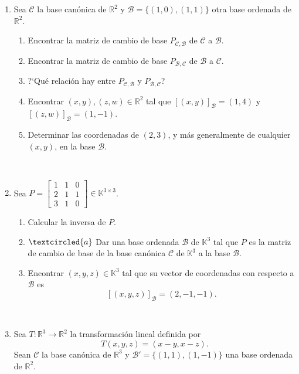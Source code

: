 \documentclass[12pt]{amsart}
\begin{document}
\begin{enumerate}
\item\label{otras bases} Sea $\mathcal{C}$ la base can\'onica de $\mathbb{R}^2$ y
	$\mathcal{B}=\{(1,0),(1,1)\}$ otra base ordenada de $\mathbb{R}^2$.
	\begin{enumerate}
		\item Encontrar la matriz de cambio de base $P_{\mathcal{C},\mathcal{B}}$ de $\mathcal{C}$ a $\mathcal{B}$.
		\item Encontrar la matriz de cambio de base $P_{\mathcal{B},\mathcal{C}}$ de $\mathcal{B}$ a $\mathcal{C}$.
		\item ?`Qu\'e relaci\'on hay entre $P_{\mathcal{C},\mathcal{B}}$ y $P_{\mathcal{B},\mathcal{C}}$?
		\item Encontrar $(x,y),(z,w)\in\mathbb{R}^2$ tal que $[(x,y)]_{\mathcal{B}}=(1,4)$ y $[(z,w)]_{\mathcal{B}}=(1,-1)$.
		\item Determinar las coordenadas de $(2,3)$, y m\'{a}s generalmente de cualquier $(x,y)$, en la base $\mathcal{B}$.
	\end{enumerate}
	
	\

\item Sea $P=\left[\begin{array}{ccc}
      1&1&0\\2&1&1\\3&1&0
      \end{array}
\right]\in\mathbb{K}^{3\times 3}
$.

\begin{enumerate}
\item Calcular la inversa de $P$.
\item\label{base de P} $\textcircled{a}$ Dar una base ordenada $\mathcal{B}$ de $\mathbb{K}^3$
tal que $P$ es la matriz de cambio de base de la base can\'onica $\mathcal{C}$ de $\mathbb{K}^3$ a la
base $\mathcal{B}$.

\item Encontrar $(x,y,z)\in\mathbb{K}^3$ tal que su vector de coordenadas con respecto a $\mathcal{B}$ es
$$[(x,y,z)]_{\mathcal{B}}=(2,-1,-1).$$
\end{enumerate}

\

\item\label{matriz transformaciones ejemplo} Sea
$T:\mathbb{R}^3\longrightarrow\mathbb{R}^2$ la transformaci\'on lineal definida por $$T(x,y,z)=(x-y,x-z).$$ Sean $\mathcal{C}$ la base can\'onica de $\mathbb{R}^3$ y $\mathcal{B}'=\{(1,1),(1,-1)\}$ una base ordenada de $\mathbb{R}^2$.


\end{enumerate}
\end{document}
